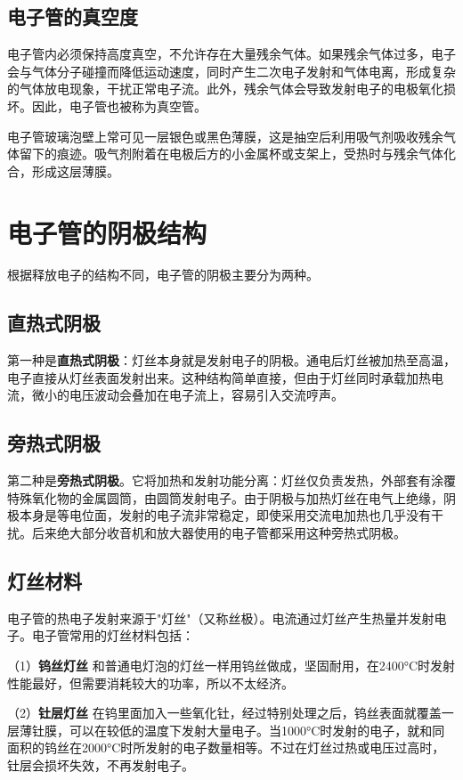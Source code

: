 \documentclass[12pt,UTF8]{ctexbook}
\begin{document}
\section{电子管的真空度}

电子管内必须保持高度真空，不允许存在大量残余气体。如果残余气体过多，电子会与气体分子碰撞而降低运动速度，同时产生二次电子发射和气体电离，形成复杂的气体放电现象，干扰正常电子流。此外，残余气体会导致发射电子的电极氧化损坏。因此，电子管也被称为真空管。

电子管玻璃泡壁上常可见一层银色或黑色薄膜，这是抽空后利用吸气剂吸收残余气体留下的痕迹。吸气剂附着在电极后方的小金属杯或支架上，受热时与残余气体化合，形成这层薄膜。

\chapter{电子管的阴极结构}

根据释放电子的结构不同，电子管的阴极主要分为两种。

\section{直热式阴极}

第一种是\textbf{直热式阴极}：灯丝本身就是发射电子的阴极。通电后灯丝被加热至高温，电子直接从灯丝表面发射出来。这种结构简单直接，但由于灯丝同时承载加热电流，微小的电压波动会叠加在电子流上，容易引入交流哼声。

\section{旁热式阴极}

第二种是\textbf{旁热式阴极}。它将加热和发射功能分离：灯丝仅负责发热，外部套有涂覆特殊氧化物的金属圆筒，由圆筒发射电子。由于阴极与加热灯丝在电气上绝缘，阴极本身是等电位面，发射的电子流非常稳定，即使采用交流电加热也几乎没有干扰。后来绝大部分收音机和放大器使用的电子管都采用这种旁热式阴极。

\section{灯丝材料}

电子管的热电子发射来源于"灯丝"（又称丝极）。电流通过灯丝产生热量并发射电子。电子管常用的灯丝材料包括：

（1）\textbf{钨丝灯丝} 和普通电灯泡的灯丝一样用钨丝做成，坚固耐用，在2400°C时发射性能最好，但需要消耗较大的功率，所以不太经济。

（2）\textbf{钍层灯丝} 在钨里面加入一些氧化钍，经过特别处理之后，钨丝表面就覆盖一层薄钍膜，可以在较低的温度下发射大量电子。当1000°C时发射的电子，就和同面积的钨丝在2000°C时所发射的电子数量相等。不过在灯丝过热或电压过高时，钍层会损坏失效，不再发射电子。
\end{document}
